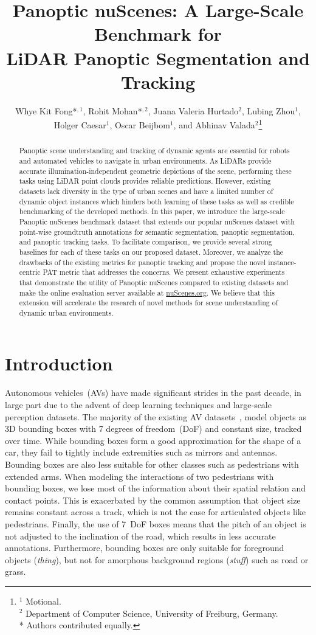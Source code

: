 \documentclass[letterpaper, 10 pt, journal, twoside]{IEEEtran}
\title{\LARGE \bf
Panoptic nuScenes: A Large-Scale Benchmark for\\LiDAR Panoptic Segmentation and Tracking
}
\author{Whye Kit Fong*$^{,1}$, Rohit Mohan*$^{,2}$, Juana Valeria Hurtado$^2$, Lubing Zhou$^1$,\\ Holger Caesar$^1$, Oscar Beijbom$^1$, and Abhinav Valada$^2$\thanks{$^1$ Motional.\\
$^2$ Department of Computer Science, University of Freiburg, Germany.\\
* Authors contributed equally.}}
\begin{document}
\maketitle
\thispagestyle{empty}
\pagestyle{empty}

\begin{abstract}
Panoptic scene understanding and tracking of dynamic agents are essential for robots and automated vehicles to navigate in urban environments. As LiDARs provide accurate illumination-independent geometric depictions of the scene, performing these tasks using LiDAR point clouds provides reliable predictions. However, existing datasets lack diversity in the type of urban scenes and have a limited number of dynamic object instances which hinders both learning of these tasks as well as credible benchmarking of the developed methods. In this paper, we introduce the large-scale Panoptic nuScenes benchmark dataset that extends our popular nuScenes dataset with point-wise groundtruth annotations for semantic segmentation, panoptic segmentation, and panoptic tracking tasks. To facilitate comparison, we provide several strong baselines for each of these tasks on our proposed dataset. Moreover, we analyze the drawbacks of the existing metrics for panoptic tracking and propose the novel instance-centric PAT metric that addresses the concerns. We present exhaustive experiments that demonstrate the utility of Panoptic nuScenes compared to existing datasets and make the online evaluation server available at \url{nuScenes.org}. We believe that this extension will accelerate the research of novel methods for scene understanding of dynamic urban environments.
\end{abstract}

\section{Introduction}

Autonomous vehicles~(AVs) have made significant strides in the past decade, in large part due to the advent of deep learning techniques and large-scale perception datasets.
The majority of the existing AV datasets~\cite{Geiger2013IJRR, caesar2020nuscenes, chang2019argoverse, houston2020one, sun2020scalability}, model objects as 3D bounding boxes with 7 degrees of freedom~(DoF) and constant size, tracked over time.
While bounding boxes form a good approximation for the shape of a car, they fail to tightly include extremities such as mirrors and antennas. Bounding boxes are also less suitable for other classes such as pedestrians with extended arms. When modeling the interactions of two pedestrians with bounding boxes, we lose most of the information about their spatial relation and contact points.
This is exacerbated by the common assumption that object size remains constant across a track, which is not the case for articulated objects like pedestrians.
Finally, the use of 7~DoF boxes means that the pitch of an object is not adjusted to the inclination of the road, which results in less accurate annotations.
Furthermore, bounding boxes are only suitable for foreground objects (\emph{thing}), but not for amorphous background regions (\emph{stuff}) such as road or grass.
\end{document}
